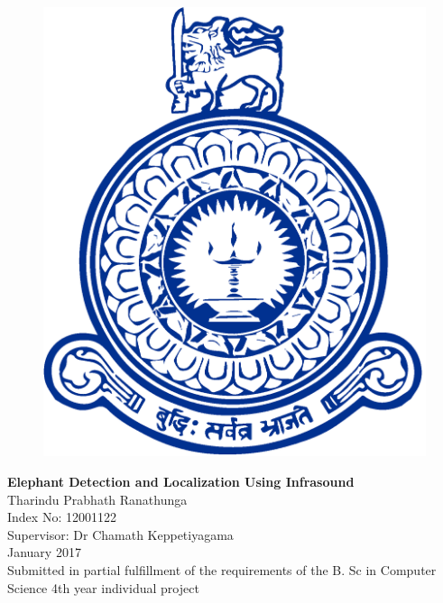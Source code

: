 \documentclass[12pt]{article}
\numberwithin{figure}{section}
\numberwithin{table}{section}
\begin{document}
 

\begin{titlepage}
\newcommand{\HRule}{\rule{\linewidth}{0.5mm}} %
\begin{figure}[H]
\centering
\includegraphics[scale=0.20]{logo}\\[1cm]
\end{figure}
\center 
{ \LARGE \bfseries Elephant Detection and Localization Using Infrasound}\\[1.5cm]
\Large Tharindu Prabhath Ranathunga\\
\Large Index No: 12001122\\[1cm]
\Large Supervisor: Dr Chamath Keppetiyagama\\[1cm]
\Large January 2017\\[1.5cm]
\large Submitted in partial fulfillment of the requirements of the B. Sc in Computer Science 4th year individual project\\[0.5cm] 

\end{titlepage}
\end{document}
